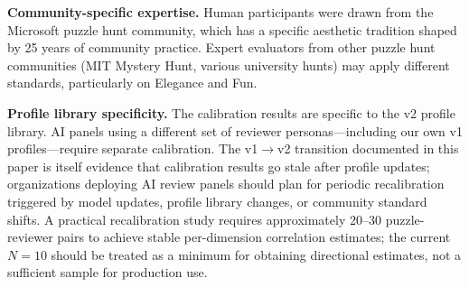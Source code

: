 \textbf{Community-specific expertise.} Human participants were drawn from the Microsoft puzzle hunt community, which has a specific aesthetic tradition shaped by 25 years of community practice. Expert evaluators from other puzzle hunt communities (MIT Mystery Hunt, various university hunts) may apply different standards, particularly on Elegance and Fun.

\textbf{Profile library specificity.} The calibration results are specific to the v2 profile library. AI panels using a different set of reviewer personas---including our own v1 profiles---require separate calibration. The v1$\to$v2 transition documented in this paper is itself evidence that calibration results go stale after profile updates; organizations deploying AI review panels should plan for periodic recalibration triggered by model updates, profile library changes, or community standard shifts. A practical recalibration study requires approximately 20--30 puzzle-reviewer pairs to achieve stable per-dimension correlation estimates; the current $N=10$ should be treated as a minimum for obtaining directional estimates, not a sufficient sample for production use.
